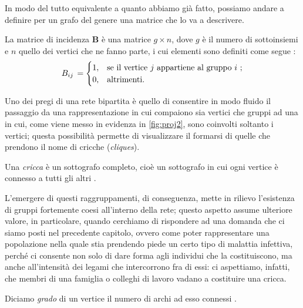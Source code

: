 In modo del tutto equivalente a quanto abbiamo già fatto, possiamo andare a definire per un grafo del genere una matrice che lo va a descrivere.
\begin{definizione}
La matrice di incidenza \textbf{B} è una matrice $ g \times n $, dove $ g $ è il numero di sottoinsiemi e $ n $ quello dei vertici che ne fanno parte, i cui elementi sono definiti come segue \cite{Newman}:
\[
B_{ij} \, =
\begin{cases}
1, & \text{se il vertice $ j $ appartiene al gruppo $ i $ };\\
0, & \text{altrimenti}.
\end{cases}
\]
\end{definizione}

	Uno dei pregi di una rete bipartita è quello di consentire in modo fluido il passaggio da una rappresentazione in cui compaiono sia vertici che gruppi ad una in cui, come viene messo in evidenza in \cref{fig:proj2}, sono coinvolti soltanto i vertici; questa possibilità permette di visualizzare il formarsi di quelle che prendono il nome di cricche (\emph{cliques}).
\begin{definizione} 
Una \emph{cricca} è un sottografo completo, cioè un sottografo in cui ogni vertice è connesso a tutti gli altri \cite{Bickle}.
\end{definizione}
L'emergere di questi raggruppamenti, di conseguenza, mette in rilievo l'esistenza di gruppi fortemente coesi all'interno della rete; questo aspetto assume ulteriore valore, in particolare, quando cerchiamo di rispondere ad una domanda che ci siamo posti nel precedente capitolo, ovvero come poter rappresentare una popolazione nella quale stia prendendo piede un certo tipo di malattia infettiva, perché ci consente non solo di dare forma agli individui che la costituiscono, ma anche all'intensità dei legami che intercorrono fra di essi: ci aspettiamo, infatti, che membri di una famiglia o colleghi di lavoro vadano a costituire una cricca. \\
\begin{definizione}
Diciamo \emph{grado} di un vertice il numero di archi ad esso connessi \cite{Newman}.
\end{definizione}

